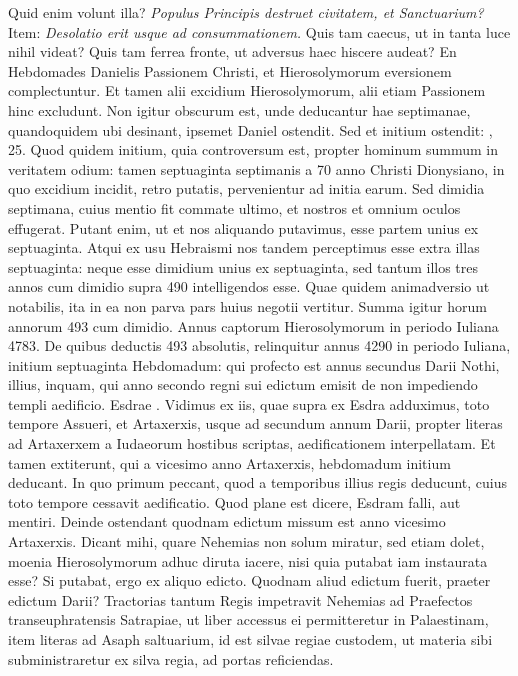 Quid enim volunt illa?
\textit{Populus Principis destruet civitatem,
et Sanctuarium?}
Item: \textit{Desolatio erit usque ad consummationem.}
Quis tam caecus, ut in tanta luce nihil videat?
Quis tam ferrea fronte, ut adversus haec hiscere audeat?
En Hebdomades
Danielis Passionem Christi, et Hierosolymorum eversionem complectuntur.
Et tamen alii excidium Hierosolymorum, alii etiam
Passionem hinc excludunt.
Non igitur obscurum est, unde deducantur
hae septimanae, quandoquidem ubi desinant, ipsemet Daniel
ostendit.
Sed et initium ostendit: , 25.
Quod quidem initium,
quia controversum est, propter hominum summum in veritatem
odium: tamen septuaginta septimanis a 70 anno Christi
Dionysiano, in quo excidium incidit, retro putatis, pervenientur
ad initia earum.
Sed dimidia septimana, cuius mentio fit commate
ultimo, et nostros et omnium oculos effugerat.
Putant enim,
ut et nos aliquando putavimus, esse partem unius ex septuaginta.
Atqui ex usu Hebraismi nos tandem perceptimus esse extra
 illas septuaginta:
neque esse dimidium unius ex septuaginta, sed tantum
illos tres annos cum dimidio supra 490 intelligendos esse.
Quae
quidem animadversio ut notabilis, ita in ea non parva pars huius
negotii vertitur.
Summa igitur horum annorum 493 cum dimidio.
Annus captorum Hierosolymorum in periodo Iuliana 4783.
De quibus deductis 493 absolutis, relinquitur annus 4290 in periodo
Iuliana, initium septuaginta Hebdomadum: qui profecto
est annus secundus Darii Nothi, illius, inquam, qui anno secondo
regni sui edictum emisit de non impediendo templi aedificio.
Esdrae .
Vidimus ex iis, quae supra ex Esdra adduximus, toto tempore
Assueri, et Artaxerxis, usque ad secundum annum Darii, propter
literas ad Artaxerxem a Iudaeorum hostibus scriptas, aedificationem
interpellatam.
Et tamen extiterunt, qui a vicesimo anno
Artaxerxis, hebdomadum initium deducant.
In quo primum
peccant, quod a temporibus illius regis deducunt, cuius toto tempore
cessavit aedificatio.
Quod plane est dicere, Esdram falli, aut mentiri.
Deinde ostendant quodnam edictum missum est anno vicesimo
Artaxerxis.
Dicant mihi, quare Nehemias non solum miratur,
sed etiam dolet, moenia Hierosolymorum adhuc diruta iacere,
nisi quia putabat iam instaurata esse?
Si putabat, ergo ex
aliquo edicto.
Quodnam aliud edictum fuerit, praeter edictum
Darii?
Tractorias tantum Regis impetravit Nehemias ad Praefectos
transeuphratensis Satrapiae, ut liber accessus ei permitteretur
in Palaestinam, item literas ad Asaph saltuarium, id est silvae regiae
custodem, ut materia sibi subministraretur ex silva regia, ad
portas reficiendas.

